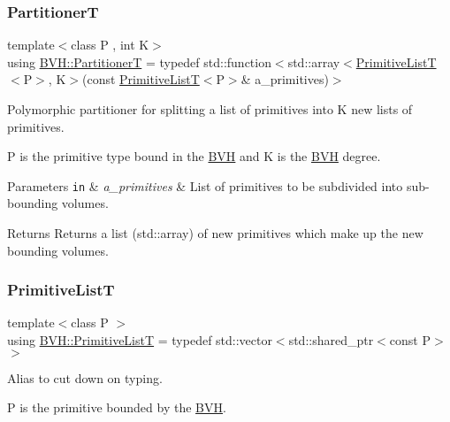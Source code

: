 \subsubsection{\texorpdfstring{PartitionerT}{PartitionerT}}
{\footnotesize\ttfamily template$<$class P , int K$>$ \\
using \hyperlink{namespaceBVH_a7c33d54da9893d506709b2ca96b76f55}{B\+V\+H\+::\+PartitionerT} = typedef std\+::function$<$std\+::array$<$\hyperlink{namespaceBVH_aa1e753bda451b85cd5b948722a2ad7c7}{Primitive\+ListT}$<$P$>$, K$>$(const \hyperlink{namespaceBVH_aa1e753bda451b85cd5b948722a2ad7c7}{Primitive\+ListT}$<$P$>$\& a\+\_\+primitives)$>$}



Polymorphic partitioner for splitting a list of primitives into K new lists of primitives. 

P is the primitive type bound in the \hyperlink{namespaceBVH}{B\+VH} and K is the \hyperlink{namespaceBVH}{B\+VH} degree. 
\begin{DoxyParams}[1]{Parameters}
\mbox{\tt in}  & {\em a\+\_\+primitives} & List of primitives to be subdivided into sub-\/bounding volumes. \\
\hline
\end{DoxyParams}
\begin{DoxyReturn}{Returns}
Returns a list (std\+::array) of new primitives which make up the new bounding volumes. 
\end{DoxyReturn}
\mbox{\label{namespaceBVH_aa1e753bda451b85cd5b948722a2ad7c7}} 
\subsubsection{\texorpdfstring{Primitive\+ListT}{PrimitiveListT}}
{\footnotesize\ttfamily template$<$class P $>$ \\
using \hyperlink{namespaceBVH_aa1e753bda451b85cd5b948722a2ad7c7}{B\+V\+H\+::\+Primitive\+ListT} = typedef std\+::vector$<$std\+::shared\+\_\+ptr$<$const P$>$ $>$}



Alias to cut down on typing. 

P is the primitive bounded by the \hyperlink{namespaceBVH}{B\+VH}. \mbox{\label{namespaceBVH_afef1c5979c34a11d23b756cc09654bf9}} 
